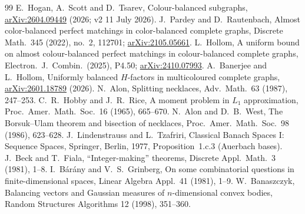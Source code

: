 \documentclass[11pt,a4paper]{article}
\theoremstyle{plain}
\theoremstyle{definition}
\theoremstyle{remark}
\begin{document}
\begin{thebibliography}{99}
\small
\setlength{\itemsep}{2pt}
 E.~Hogan, A.~Scott and D.~Tsarev, Colour-balanced subgraphs, \href{https://arxiv.org/abs/2604.09449}{arXiv:2604.09449} (2026; v2 11 July 2026).
 J.~Pardey and D.~Rautenbach, Almost color-balanced perfect matchings in color-balanced complete graphs, Discrete Math.\ 345 (2022), no.~2, 112701; \href{https://arxiv.org/abs/2105.05661}{arXiv:2105.05661}.
 L.~Hollom, A uniform bound on almost colour-balanced perfect matchings in colour-balanced complete graphs, Electron.\ J.\ Combin.\ (2025), P4.50; \href{https://arxiv.org/abs/2410.07993}{arXiv:2410.07993}.
 A.~Banerjee and L.~Hollom, Uniformly balanced $H$-factors in multicoloured complete graphs, \href{https://arxiv.org/abs/2601.18789}{arXiv:2601.18789} (2026).
 N.~Alon, Splitting necklaces, Adv.\ Math.\ 63 (1987), 247--253.
 C.~R.~Hobby and J.~R.~Rice, A moment problem in $L_1$ approximation, Proc.\ Amer.\ Math.\ Soc.\ 16 (1965), 665--670.
 N.~Alon and D.~B.~West, The Borsuk--Ulam theorem and bisection of necklaces, Proc.\ Amer.\ Math.\ Soc.\ 98 (1986), 623--628.
 J.~Lindenstrauss and L.~Tzafriri, Classical Banach Spaces I: Sequence Spaces, Springer, Berlin, 1977, Proposition~1.c.3 (Auerbach bases).
 J.~Beck and T.~Fiala, ``Integer-making'' theorems, Discrete Appl.\ Math.\ 3 (1981), 1--8.
 I.~Bárány and V.~S.~Grinberg, On some combinatorial questions in finite-dimensional spaces, Linear Algebra Appl.\ 41 (1981), 1--9.
 W.~Banaszczyk, Balancing vectors and Gaussian measures of $n$-dimensional convex bodies, Random Structures Algorithms 12 (1998), 351--360.
\end{thebibliography}
\end{document}
